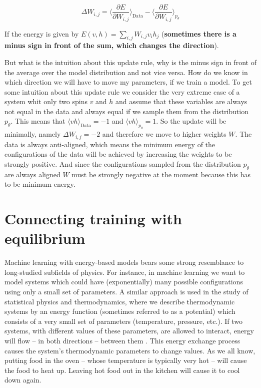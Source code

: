 \documentclass[nofootinbib, superscriptaddress, prl]{revtex4}
\begin{document}
\begin{equation*}
	\Delta W_{i,j} = \langle \frac{ \partial E}{\partial W_{i,j}} \rangle_{\text{Data}} - \langle \frac{\partial E}{\partial W_{i,j}} \rangle_{p_{\theta}} %
\end{equation*}

If the energy is given by $E(v,h) = \sum_{i,j} W_{i,j} v_i h_j $ (\textbf{sometimes there is a minus sign in front of the sum, which changes the direction}).

But what is the intuition about this update rule, why is the minus sign in front of the average over the model distribution and not vice versa. How do we know in which direction we will have to move my parameters, if we train a model.
To get some intuition about this update rule we consider the very extreme case of a system whit only two spins $v$ and $h$ and assume that these variables are always not equal in the data and always equal if we sample them from the distribution $p_{\theta}$. This means that $\langle v h \rangle_{\text{Data}} = -1$
 and $\langle v h \rangle_{p_{\theta}}  = 1$. So the update will be minimally, namely $\Delta W_{i,j} = -2$ and therefore we move to higher weights $W$. The data is always anti-aligned, which means the minimum energy of the configurations of the data will be achieved by increasing the weights to be strongly positive. And since the configurations sampled from the distribution $p_{\theta}$ are always aligned $W$ must be strongly negative at the moment because this has to be minimum energy.
 

 
\section{Connecting training with equilibrium}

Machine learning with energy-based models bears some strong resemblance to long-studied subfields of physics. For instance, in machine learning we want to model systems which could have (exponentially) many possible configurations using only a small set of parameters. A similar approach is used in the study of statistical physics and thermodynamics, where we describe thermodynamic systems by an energy function (sometimes referred to as a potential) which consists of a very small set of parameters (temperature, pressure, etc.). If two systems, with different values of these parameters, are allowed to interact, energy will flow -- in both directions -- between them . This energy exchange process causes the system's thermodynamic parameters to change values. As we all know, putting food in the oven -- whose temperature is typically very hot -- will cause the food to heat up. Leaving hot food out in the kitchen will cause it to cool down again. 
\end{document}

